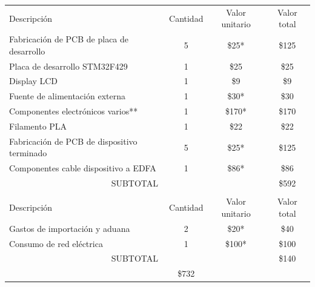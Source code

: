 \documentclass[
11pt, %
codirector, %
]{charter}
\begin{document}
\begin{table}[H]
\centering
\begin{tabularx}{\linewidth}{@{}|X|c|r|r|@{}}
\hline
\rowcolor[HTML]{C0C0C0} 
\multicolumn{4}{|c|}{\cellcolor[HTML]{C0C0C0}COSTOS DIRECTOS} \\ \hline
\rowcolor[HTML]{C0C0C0} 
Descripción &
  \multicolumn{1}{c|}{\cellcolor[HTML]{C0C0C0}Cantidad} &
  \multicolumn{1}{c|}{\cellcolor[HTML]{C0C0C0}Valor unitario} &
  \multicolumn{1}{c|}{\cellcolor[HTML]{C0C0C0}Valor total} \\ \hline
Fabricación de PCB de placa de desarrollo &
  \multicolumn{1}{c|}{5} &
  \multicolumn{1}{c|}{\$25*} &
  \multicolumn{1}{c|}{\$125} \\ \hline
Placa de desarrollo STM32F429 &
  \multicolumn{1}{c|}{1} &
  \multicolumn{1}{c|}{\$25} &
  \multicolumn{1}{c|}{\$25} \\ \hline
Display LCD &
  \multicolumn{1}{c|}{1} &
  \multicolumn{1}{c|}{\$9} &
  \multicolumn{1}{c|}{\$9} \\ \hline
Fuente de alimentación externa &
  \multicolumn{1}{c|}{1} &
  \multicolumn{1}{c|}{\$30*} &
  \multicolumn{1}{c|}{\$30} \\ \hline
Componentes electrónicos varios** &
  \multicolumn{1}{c|}{1} &
  \multicolumn{1}{c|}{\$170*} &
  \multicolumn{1}{c|}{\$170} \\ \hline
Filamento PLA &
  \multicolumn{1}{c|}{1} &
  \multicolumn{1}{c|}{\$22} &
  \multicolumn{1}{c|}{\$22} \\ \hline
Fabricación de PCB de dispositivo terminado &
  \multicolumn{1}{c|}{5} &
  \multicolumn{1}{c|}{\$25*} &
  \multicolumn{1}{c|}{\$125} \\ \hline
Componentes cable dispositivo a EDFA &
  \multicolumn{1}{c|}{1} &
  \multicolumn{1}{c|}{\$86*} &
  \multicolumn{1}{c|}{\$86} \\ \hline
\multicolumn{3}{|c|}{SUBTOTAL} &
  \multicolumn{1}{c|}{\$592} \\ \hline
\rowcolor[HTML]{C0C0C0} 
\multicolumn{4}{|c|}{\cellcolor[HTML]{C0C0C0}COSTOS INDIRECTOS} \\ \hline
\rowcolor[HTML]{C0C0C0} 
Descripción &
  \multicolumn{1}{c|}{\cellcolor[HTML]{C0C0C0}Cantidad} &
  \multicolumn{1}{c|}{\cellcolor[HTML]{C0C0C0}Valor unitario} &
  \multicolumn{1}{c|}{\cellcolor[HTML]{C0C0C0}Valor total} \\ \hline
Gastos de importación y aduana &
  \multicolumn{1}{c|}{2} &
  \multicolumn{1}{c|}{\$20*} &
  \multicolumn{1}{c|}{\$40} \\ \hline
Consumo de red eléctrica &
  \multicolumn{1}{c|}{1} &
  \multicolumn{1}{c|}{\$100*} &
  \multicolumn{1}{c|}{\$100} \\ \hline
\multicolumn{3}{|c|}{SUBTOTAL} &
  \multicolumn{1}{c|}{\$140} \\ \hline
\rowcolor[HTML]{C0C0C0}
\multicolumn{3}{|c|}{TOTAL} &
 \multicolumn{1}{|c|}{\$732}
   \\ \hline
\end{tabularx}
\end{table}
\end{document}
